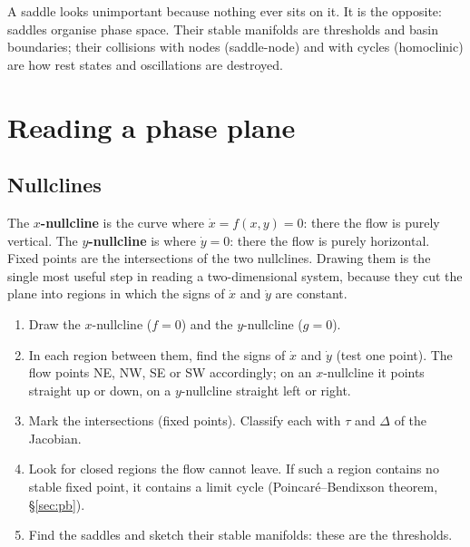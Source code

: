 \documentclass[11pt,openany]{report}
\begin{document}
\begin{pitfall}
A saddle looks unimportant because nothing ever sits on it. It is the opposite: saddles organise phase space. Their
stable manifolds are thresholds and basin boundaries; their collisions with nodes (saddle-node) and with cycles
(homoclinic) are how rest states and oscillations are destroyed.
\end{pitfall}

\chapter{Reading a phase plane}
\section{Nullclines}
The \textbf{$x$-nullcline} is the curve where $\dot x = f(x,y) = 0$: there the flow is purely vertical. The
\textbf{$y$-nullcline} is where $\dot y = 0$: there the flow is purely horizontal. Fixed points are the intersections of
the two nullclines. Drawing them is the single most useful step in reading a two-dimensional system, because they cut
the plane into regions in which the signs of $\dot x$ and $\dot y$ are constant.

\begin{recipe}
\begin{enumerate}
\item Draw the $x$-nullcline ($f=0$) and the $y$-nullcline ($g=0$).
\item In each region between them, find the signs of $\dot x$ and $\dot y$ (test one point). The flow points
NE, NW, SE or SW accordingly; on an $x$-nullcline it points straight up or down, on a $y$-nullcline straight left or
right.
\item Mark the intersections (fixed points). Classify each with $\tau$ and $\Delta$ of the Jacobian.
\item Look for closed regions the flow cannot leave. If such a region contains no stable fixed point, it contains a
limit cycle (Poincaré--Bendixson theorem, \S\ref{sec:pb}).
\item Find the saddles and sketch their stable manifolds: these are the thresholds.
\end{enumerate}
\end{recipe}
\end{document}

